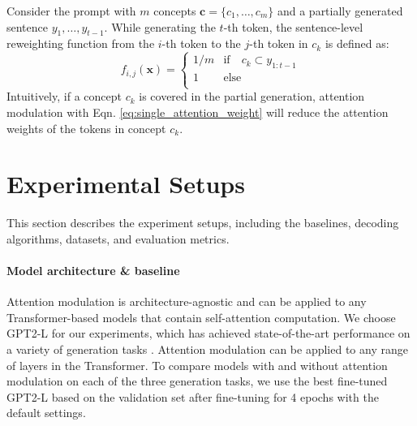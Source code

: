 \documentclass[11pt,a4paper]{article}
\newcommand{\alg}{attention modulation}
\begin{document}
Consider the prompt with $m$ concepts $\bm{c}=\{c_1,\ldots,c_m\}$ and a partially generated sentence $y_1,\ldots,y_{t-1}$. While generating the $t$-th token, the sentence-level reweighting function from the $i$-th token to the $j$-th token in $c_k$ is defined as:
\begin{equation} 
\label{eq:single_attention_weight}
    f_{i,j}(\bm{x}) = 
     \begin{cases}
1/m &\text{if} \quad c_k \subset y_{1:t-1}\\
1 &\text{else}\\
\end{cases}
\end{equation}
Intuitively, if a concept $c_k$ is covered in the partial generation, \alg{} with Eqn. \ref{eq:single_attention_weight} will reduce the attention weights of the tokens in concept $c_k$.
 



\section{Experimental Setups}\label{sec:experiment}
This section describes the experiment setups, including the baselines, decoding algorithms, datasets, and evaluation metrics.

\paragraph{Model architecture \& baseline } Attention modulation is architecture-agnostic and can be applied to any Transformer-based models that contain self-attention computation. We choose GPT2-L \citep{radford2019language} for our experiments, which has achieved state-of-the-art performance on a variety of generation tasks \citep{vig-belinkov-2019-analyzing}. Attention modulation can be applied to any range of layers in the Transformer. %
To compare models with and without \alg{} on each of the three generation tasks, we use the best fine-tuned GPT2-L based on the validation set after  fine-tuning for 4 epochs with the default settings.  
\end{document}
